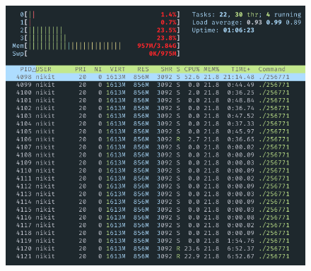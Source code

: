 \documentclass[11pt, a4paper]{article}
\begin{document}
\begin{figure}[h]
  \centering
  \includegraphics[width=\textwidth]{htop-1.png}
\end{figure}
\end{document}
